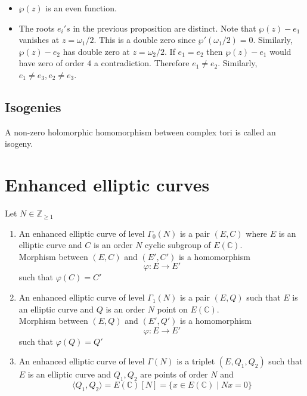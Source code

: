 \documentclass[oneside, 12pt]{scrbook}
\newcommand{\CC}{\mathbb C}
\newcommand{\ZZ}{\mathbb Z}
\theoremstyle{theorem}
\begin{document}
\begin{remark}
\begin{itemize}
\item $\wp(z)$ is an even function.
\item The roots $e_{i}'s$ in the previous proposition are distinct. Note that $\wp(z)-e_{1}$ vanishes at $z=\omega_{1}/2$. This is a double zero since $\wp'(\omega_{1}/2)=0$. Similarly, $\wp(z)-e_{2}$ has double zero at $z= \omega_{2}/2$. If $e_{1}=e_{2}$ then $\wp(z)-e_{1}$ would have zero of order $4$ a contradiction. Therefore $e_{1}\neq e_{2}$. Similarly, $e_{1}\neq e_{3}, e_{2} \neq e_{3}$.
\end{itemize}
\end{remark}

\subsection{Isogenies}

\begin{definition}
A non-zero holomorphic homomorphism between complex tori is called an isogeny.
\end{definition}

\section{Enhanced elliptic curves}
Let $N \in \ZZ_{\geq 1}$
\begin{definition}
\begin{enumerate}
\item An enhanced elliptic curve of level $\Gamma_{0}(N)$ is a pair $(E,C)$ where $E$ is an elliptic curve and $C$ is an order $N$ cyclic subgroup of $E(\CC)$. \\
Morphism between $(E,C)$ and $(E',C')$ is a homomorphism $$\varphi : E \rightarrow E'$$ such that $\varphi (C) = C'$
\item An enhanced elliptic curve of level $\Gamma_{1}(N)$ is a pair $(E,Q)$ such that  $E$ is an elliptic curve and $Q$ is an order $N$ point on $E(\CC)$. \\
Morphism between $(E,Q)$ and $(E',Q')$ is a homomorphism $$\varphi : E \rightarrow E'$$ such that $\varphi (Q) = Q'$
\item An enhanced elliptic curve of level $\Gamma(N)$ is a triplet $(E,Q_{1},Q_{2})$ such that $E$ is an elliptic curve and $Q_{1},Q_{2}$ are points of order $N$ and $$\langle Q_{1} , Q_{2} \rangle = E(\CC)[N] = \{ x \in E(\CC) \mid Nx =0\}$$
\end{enumerate}
\end{definition}
\end{document}
